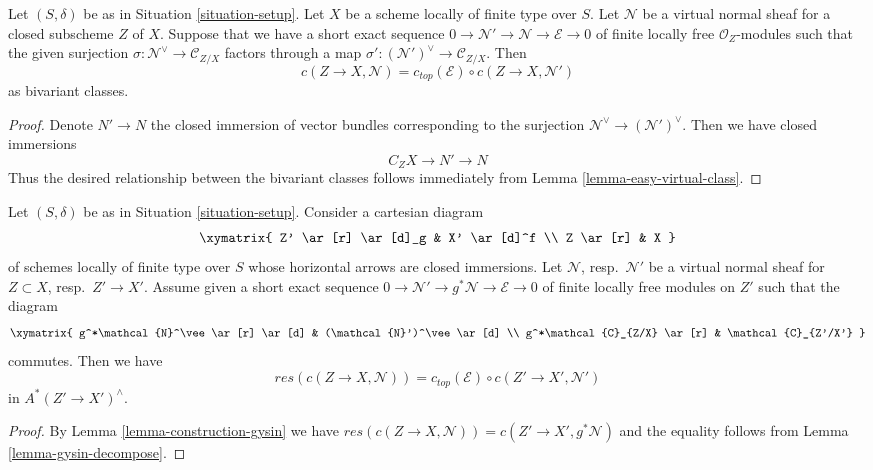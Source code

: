 \begin{lemma}
\label{lemma-gysin-decompose}
Let $(S, \delta)$ be as in Situation \ref{situation-setup}. Let $X$ be a scheme
locally of finite type over $S$. Let $\mathcal{N}$ be a virtual normal
sheaf for a closed subscheme $Z$ of $X$. Suppose that we have a short
exact sequence $0 \to \mathcal{N}' \to \mathcal{N} \to \mathcal{E} \to 0$
of finite locally free $\mathcal{O}_Z$-modules such that the given surjection
$\sigma : \mathcal{N}^\vee \to \mathcal{C}_{Z/X}$ factors through a map
$\sigma' : (\mathcal{N}')^\vee \to \mathcal{C}_{Z/X}$.
Then
$$
c(Z \to X, \mathcal{N}) = c_{top}(\mathcal{E}) \circ c(Z \to X, \mathcal{N}')
$$
as bivariant classes.
\end{lemma}

\begin{proof}
Denote $N' \to N$ the closed immersion of vector bundles corresponding
to the surjection $\mathcal{N}^\vee \to (\mathcal{N}')^\vee$. Then we
have closed immersions
$$
C_ZX \to N' \to N
$$
Thus the desired relationship between the bivariant classes follows
immediately from Lemma \ref{lemma-easy-virtual-class}.
\end{proof}

\begin{lemma}
\label{lemma-gysin-excess}
Let $(S, \delta)$ be as in Situation \ref{situation-setup}. Consider
a cartesian diagram
$$
\xymatrix{
Z' \ar[r] \ar[d]_g & X' \ar[d]^f \\
Z \ar[r] & X
}
$$
of schemes locally of finite type over $S$ whose horizontal arrows
are closed immersions. Let $\mathcal{N}$, resp.\ $\mathcal{N}'$
be a virtual normal sheaf for $Z \subset X$, resp.\ $Z' \to X'$.
Assume given a short exact sequence
$0 \to \mathcal{N}' \to g^*\mathcal{N} \to \mathcal{E} \to 0$
of finite locally free modules on $Z'$ such that the diagram
$$
\xymatrix{
g^*\mathcal{N}^\vee \ar[r] \ar[d] &
(\mathcal{N}')^\vee \ar[d] \\
g^*\mathcal{C}_{Z/X} \ar[r] &
\mathcal{C}_{Z'/X'}
}
$$
commutes. Then we have
$$
res(c(Z \to X, \mathcal{N})) =
c_{top}(\mathcal{E}) \circ c(Z' \to X', \mathcal{N}')
$$
in $A^*(Z' \to X')^\wedge$.
\end{lemma}

\begin{proof}
By Lemma \ref{lemma-construction-gysin} we have
$res(c(Z \to X, \mathcal{N})) = c(Z' \to X', g^*\mathcal{N})$
and the equality follows from Lemma \ref{lemma-gysin-decompose}.
\end{proof}

